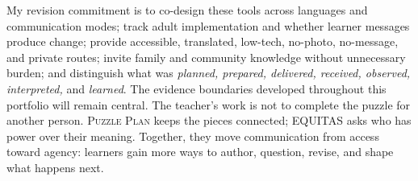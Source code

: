 \documentclass[11pt]{article}
\begin{document}
My revision commitment is to co-design these tools across languages and communication modes; track adult implementation and whether learner messages produce change; provide accessible, translated, low-tech, no-photo, no-message, and private routes; invite family and community knowledge without unnecessary burden; and distinguish what was \textit{planned, prepared, delivered, received, observed, interpreted,} and \textit{learned}. The evidence boundaries developed throughout this portfolio will remain central. The teacher's work is not to complete the puzzle for another person. \textsc{Puzzle Plan} keeps the pieces connected; \textsc{EQUITAS} asks who has power over their meaning. Together, they move communication from access toward agency: learners gain more ways to author, question, revise, and shape what happens next.
\endgroup

\clearpage

\end{document}
